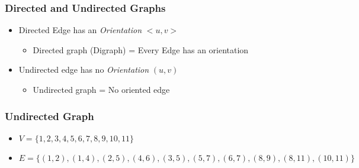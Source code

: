 \documentclass[newPxFont,sthlmFooter,nooffset]{beamer}
\begin{document}
\begin{frame}[t]
  \frametitle{Directed and Undirected Graphs}
  \begin{itemize}
  \item Directed Edge has an \textit{Orientation} $<u, v>$
    \begin{itemize}
    \item Directed graph (Digraph) = Every Edge has an orientation
    \end{itemize}
  \end{itemize}
  \begin{center}
  \end{center}
  \begin{itemize}
  \item Undirected edge has no \textit{Orientation} $(u, v)$
    \begin{itemize}
    \item Undirected graph = No oriented edge
    \end{itemize}
  \end{itemize}
  \begin{center}
  \end{center}
\end{frame}


\begin{frame}[t]
  \frametitle{Undirected Graph}
  \begin{center}
    \hspace{3em}
  \end{center}
  \begin{itemize}
  \item $V=\{1, 2, 3, 4, 5, 6, 7, 8, 9, 10, 11\}$
  \item $E=\{(1, 2), (1, 4), (2, 5), (4, 6), (3, 5), (5, 7), (6, 7), (8, 9), (8, 11), (10, 11)\}$
  \end{itemize}
\end{frame}
\end{document}
